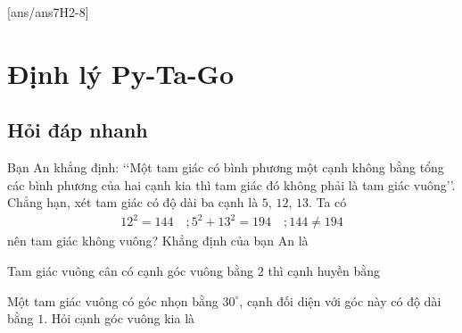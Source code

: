[ans/ans7H2-8]
\section{Định lý Py-Ta-Go}
\subsection{Hỏi đáp nhanh}
\begin{ex}%
	Bạn An khẳng định: \lq\lq Một tam giác có bình phương một cạnh không bằng tổng các bình phương của hai cạnh kia thì tam giác đó không phải là tam giác vuông\rq\rq. \\
	Chẳng hạn, xét tam giác  có độ dài ba cạnh là $ 5 $, $ 12 $, $ 13 $. Ta có
	\begin{align*}
		12^2 = 144 \quad ; 5^2 + 13^2 = 194 \quad ; 144 \neq 194
	\end{align*}
	nên tam giác không vuông? Khẳng định của bạn An là 
\end{ex}

\begin{ex}%
	Tam giác vuông cân có cạnh góc vuông bằng $ 2 $ thì cạnh huyền bằng 
\end{ex}

\begin{ex}%
	Một tam giác vuông có góc nhọn bằng $ 30^\circ $, cạnh đối diện với góc này có độ dài bằng $ 1 $. Hỏi cạnh góc vuông kia là 
\end{ex}

